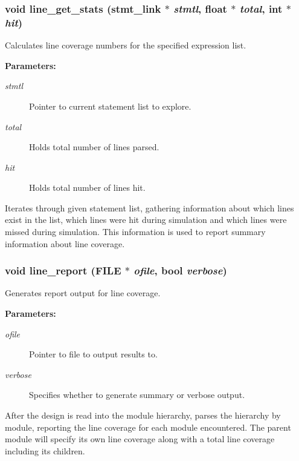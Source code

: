 \subsubsection{\setlength{\rightskip}{0pt plus 5cm}void line\_\-get\_\-stats ({\bf stmt\_\-link} $\ast$ {\em stmtl}, float $\ast$ {\em total}, int $\ast$ {\em hit})}\label{line_8h_a0}


Calculates line coverage numbers for the specified expression list.

\begin{Desc}
\item[{\bf Parameters: }]\par
\begin{description}
\item[
{\em stmtl}]Pointer to current statement list to explore. \item[
{\em total}]Holds total number of lines parsed. \item[
{\em hit}]Holds total number of lines hit.

\end{description}
\end{Desc}
Iterates through given statement list, gathering information about which lines exist in the list, which lines were hit during simulation and which lines were missed during simulation. This information is used to report summary information about line coverage. 
\subsubsection{\setlength{\rightskip}{0pt plus 5cm}void line\_\-report (FILE $\ast$ {\em ofile}, {\bf bool} {\em verbose})}\label{line_8h_a1}


Generates report output for line coverage.

\begin{Desc}
\item[{\bf Parameters: }]\par
\begin{description}
\item[
{\em ofile}]Pointer to file to output results to. \item[
{\em verbose}]Specifies whether to generate summary or verbose output.

\end{description}
\end{Desc}
After the design is read into the module hierarchy, parses the hierarchy by module, reporting the line coverage for each module encountered. The parent module will specify its own line coverage along with a total line coverage including its  children. 